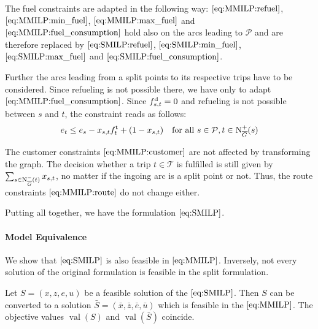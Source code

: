 The fuel constraints are adapted in the following way: $\eqref{eq:MMILP:refuel}$, $\eqref{eq:MMILP:min_fuel}$, $\eqref{eq:MMILP:max_fuel}$ and $\eqref{eq:MMILP:fuel_consumption}$ hold also on the arcs leading to $\mathcal{P}$ and are therefore replaced by $\eqref{eq:SMILP:refuel}$, $\eqref{eq:SMILP:min_fuel}$, $\eqref{eq:SMILP:max_fuel}$ and $\eqref{eq:SMILP:fuel_consumption}$.

Further the arcs leading from a split points to its respective trips have to be considered. Since refueling is not possible there, we have only to adapt $\eqref{eq:MMILP:fuel_consumption}$. Since $f^{\operatorname{d}}_{s,t} = 0$ and refueling is not possible between $s$ and $t$, the constraint reads as follows:
\begin{align}
	e_t \leq e_s - x_{s,t}f^{\operatorname{t}}_t + \left(1-x_{s,t}\right) && \text{for all } s\in \mathcal{P},t\in\operatorname{N}_{\overline{G}}^+(s) \label{eq:SMILP:fuel_splitpoint}
\end{align}

The customer constraints $\eqref{eq:MMILP:customer}$ are not affected by transforming the graph. The decision whether a trip $t\in\mathcal{T}$ is fulfilled is still given by $\sum_{s\in\operatorname{N}_{\overline{G}}^-(t)} x_{s,t}$, no matter if the ingoing arc is a split point or not. Thus, the route constraints $\eqref{eq:MMILP:route}$ do not change either.

Putting all together, we have the formulation $\eqref{eq:SMILP}$.

\paragraph{Model Equivalence} \parfill

We show that $\eqref{eq:SMILP}$ is also feasible in $\eqref{eq:MMILP}$. Inversely, not every solution of the original formulation is feasible in the split formulation.

\begin{theorem}
\label{thm:equivalence_SMILP_MMILP}

Let ${S=(x,z,e,u)}$ be a feasible solution of the $\eqref{eq:SMILP}$. Then $S$ can be converted to a solution ${\bar{S}=\left(\bar{x},\bar{z},\bar{e},\bar{u}\right)}$ which is feasible in the $\eqref{eq:MMILP}$. The objective values $\operatorname{val}(S)$ and $\operatorname{val}(\bar{S})$ coincide.

\end{theorem}

